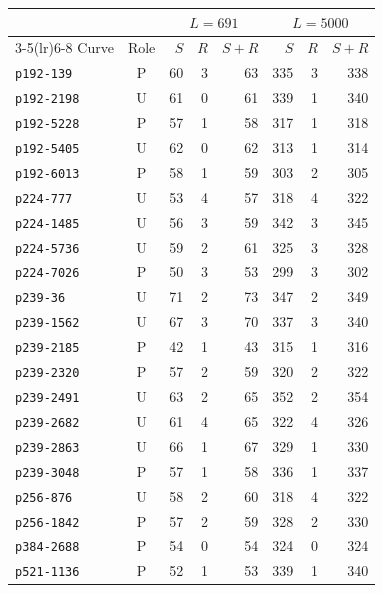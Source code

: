 \begin{tabular}{lcrrrrrr}
\toprule
 & & \multicolumn{3}{c}{$L=691$} & \multicolumn{3}{c}{$L=5000$} \\
\cmidrule(lr){3-5}\cmidrule(lr){6-8}
Curve & Role & $S$ & $R$ & $S+R$ & $S$ & $R$ & $S+R$ \\
\midrule
\texttt{p192-139} & P & 60 & 3 & 63 & 335 & 3 & 338 \\
\texttt{p192-2198} & U & 61 & 0 & 61 & 339 & 1 & 340 \\
\texttt{p192-5228} & P & 57 & 1 & 58 & 317 & 1 & 318 \\
\texttt{p192-5405} & U & 62 & 0 & 62 & 313 & 1 & 314 \\
\texttt{p192-6013} & P & 58 & 1 & 59 & 303 & 2 & 305 \\
\texttt{p224-777} & U & 53 & 4 & 57 & 318 & 4 & 322 \\
\texttt{p224-1485} & U & 56 & 3 & 59 & 342 & 3 & 345 \\
\texttt{p224-5736} & U & 59 & 2 & 61 & 325 & 3 & 328 \\
\texttt{p224-7026} & P & 50 & 3 & 53 & 299 & 3 & 302 \\
\texttt{p239-36} & U & 71 & 2 & 73 & 347 & 2 & 349 \\
\texttt{p239-1562} & U & 67 & 3 & 70 & 337 & 3 & 340 \\
\texttt{p239-2185} & P & 42 & 1 & 43 & 315 & 1 & 316 \\
\texttt{p239-2320} & P & 57 & 2 & 59 & 320 & 2 & 322 \\
\texttt{p239-2491} & U & 63 & 2 & 65 & 352 & 2 & 354 \\
\texttt{p239-2682} & U & 61 & 4 & 65 & 322 & 4 & 326 \\
\texttt{p239-2863} & U & 66 & 1 & 67 & 329 & 1 & 330 \\
\texttt{p239-3048} & P & 57 & 1 & 58 & 336 & 1 & 337 \\
\texttt{p256-876} & U & 58 & 2 & 60 & 318 & 4 & 322 \\
\texttt{p256-1842} & P & 57 & 2 & 59 & 328 & 2 & 330 \\
\texttt{p384-2688} & P & 54 & 0 & 54 & 324 & 0 & 324 \\
\texttt{p521-1136} & P & 52 & 1 & 53 & 339 & 1 & 340 \\
\bottomrule
\end{tabular}
